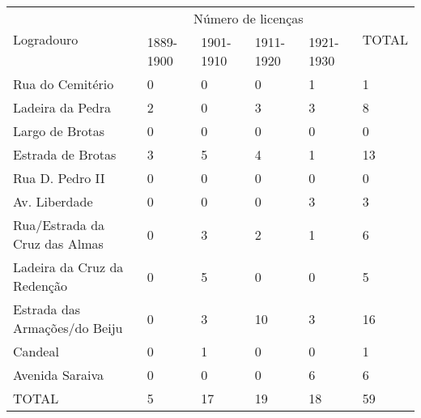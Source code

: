 \begin{table}[!htp]
{
\begin{tiny}
\begin{tabular}{llllll}
\toprule
\multirow{2}{*}{Logradouro}	& \multicolumn{4}{c}{Número de licenças}	& \multirow{2}{*}{TOTAL}\\
\cline{2-5}
	&1889-1900	&1901-1910	&1911-1920	&1921-1930	& \\
\midrule
\midrule
Rua do Cemitério	&0	&0	&0	&1	&1\\
Ladeira da Pedra	&2	&0	&3	&3	&8\\
Largo de Brotas	&0	&0	&0	&0	&0\\
Estrada de Brotas	&3	&5	&4	&1	&13\\
Rua D. Pedro II	&0	&0	&0	&0	&0\\
Av. Liberdade	&0	&0	&0	&3	&3\\
Rua/Estrada da Cruz das Almas	&0	&3	&2	&1	&6\\
Ladeira da Cruz da Redenção	&0	&5	&0	&0	&5\\
Estrada das Armações/do Beiju	&0	&3	&10	&3	&16\\
Candeal	&0	&1	&0	&0	&1\\
Avenida Saraiva	&0	&0	&0	&6	&6\\
\midrule
TOTAL	&5	&17	&19	&18	&59\\
\bottomrule
\end{tabular} 
\end{tiny}
}
{}
\end{table}